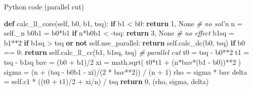 \documentclass[10pt,ignorenonframetext,serif,onlymath]{beamer}
\newenvironment{Shaded}{}{}
\newcommand{\CommentTok}[1]{\textcolor[rgb]{0.38,0.63,0.69}{\textit{#1}}}
\newcommand{\ControlFlowTok}[1]{\textcolor[rgb]{0.00,0.44,0.13}{\textbf{#1}}}
\newcommand{\DecValTok}[1]{\textcolor[rgb]{0.25,0.63,0.44}{#1}}
\newcommand{\KeywordTok}[1]{\textcolor[rgb]{0.00,0.44,0.13}{\textbf{#1}}}
\newcommand{\NormalTok}[1]{#1}
\newcommand{\OperatorTok}[1]{\textcolor[rgb]{0.40,0.40,0.40}{#1}}
\newcommand{\VariableTok}[1]{\textcolor[rgb]{0.10,0.09,0.49}{#1}}
\begin{document}
\begin{frame}[fragile]{Python code (parallel cut)}
\protect\hypertarget{python-code-parallel-cut}{}

\scriptsize

\begin{Shaded}
\begin{Highlighting}[]
\KeywordTok{def}\NormalTok{ calc_ll_core(}\VariableTok{self}\NormalTok{, b0, b1, tsq):}
    \ControlFlowTok{if}\NormalTok{ b1 }\OperatorTok{<}\NormalTok{ b0:}
        \ControlFlowTok{return} \DecValTok{1}\NormalTok{, }\VariableTok{None}  \CommentTok{# no sol'n}
\NormalTok{    n }\OperatorTok{=} \VariableTok{self}\NormalTok{._n}
\NormalTok{    b0b1 }\OperatorTok{=}\NormalTok{ b0}\OperatorTok{*}\NormalTok{b1}
    \ControlFlowTok{if}\NormalTok{ n}\OperatorTok{*}\NormalTok{b0b1 }\OperatorTok{<} \OperatorTok{-}\NormalTok{tsq:}
        \ControlFlowTok{return} \DecValTok{3}\NormalTok{, }\VariableTok{None}  \CommentTok{# no effect}
\NormalTok{    b1sq }\OperatorTok{=}\NormalTok{ b1}\OperatorTok{**}\DecValTok{2}
    \ControlFlowTok{if}\NormalTok{ b1sq }\OperatorTok{>}\NormalTok{ tsq }\KeywordTok{or} \KeywordTok{not} \VariableTok{self}\NormalTok{.use_parallel:}
        \ControlFlowTok{return} \VariableTok{self}\NormalTok{.calc_dc(b0, tsq)}
    \ControlFlowTok{if}\NormalTok{ b0 }\OperatorTok{==} \DecValTok{0}\NormalTok{:}
        \ControlFlowTok{return} \VariableTok{self}\NormalTok{.calc_ll_cc(b1, b1sq, tsq)}
    \CommentTok{# parallel cut}
\NormalTok{    t0 }\OperatorTok{=}\NormalTok{ tsq }\OperatorTok{-}\NormalTok{ b0}\OperatorTok{**}\DecValTok{2}
\NormalTok{    t1 }\OperatorTok{=}\NormalTok{ tsq }\OperatorTok{-}\NormalTok{ b1sq}
\NormalTok{    bav }\OperatorTok{=}\NormalTok{ (b0 }\OperatorTok{+}\NormalTok{ b1)}\OperatorTok{/}\DecValTok{2}
\NormalTok{    xi }\OperatorTok{=}\NormalTok{ math.sqrt( t0}\OperatorTok{*}\NormalTok{t1 }\OperatorTok{+}\NormalTok{ (n}\OperatorTok{*}\NormalTok{bav}\OperatorTok{*}\NormalTok{(b1 }\OperatorTok{-}\NormalTok{ b0))}\OperatorTok{**}\DecValTok{2}\NormalTok{ )}
\NormalTok{    sigma }\OperatorTok{=}\NormalTok{ (n }\OperatorTok{+}\NormalTok{ (tsq }\OperatorTok{-}\NormalTok{ b0b1 }\OperatorTok{-}\NormalTok{ xi)}\OperatorTok{/}\NormalTok{(}\DecValTok{2} \OperatorTok{*}\NormalTok{ bav}\OperatorTok{**}\DecValTok{2}\NormalTok{)) }\OperatorTok{/}\NormalTok{ (n }\OperatorTok{+} \DecValTok{1}\NormalTok{)}
\NormalTok{    rho }\OperatorTok{=}\NormalTok{ sigma }\OperatorTok{*}\NormalTok{ bav}
\NormalTok{    delta }\OperatorTok{=} \VariableTok{self}\NormalTok{.c1 }\OperatorTok{*}\NormalTok{ ((t0 }\OperatorTok{+}\NormalTok{ t1)}\OperatorTok{/}\DecValTok{2} \OperatorTok{+}\NormalTok{ xi}\OperatorTok{/}\NormalTok{n) }\OperatorTok{/}\NormalTok{ tsq}
    \ControlFlowTok{return} \DecValTok{0}\NormalTok{, (rho, sigma, delta)}
\end{Highlighting}
\end{Shaded}

\end{frame}
\end{document}
